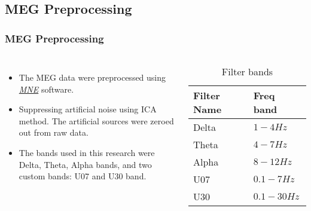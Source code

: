 \documentclass[aspectratio=169]{beamer}
\begin{document}
\subsection{MEG Preprocessing}
\begin{frame}
    \frametitle{MEG Preprocessing}

    \begin{columns}
        \begin{itemize}
            \item The MEG data were preprocessed using \hyperlink{https://mne.tools/stable/index.html}{\emph{MNE}} software.
            \item Suppressing artificial noise using ICA method.
                  The artificial sources were zeroed out from raw data.
            \item The bands used in this research were Delta, Theta, Alpha bands, and two custom bands: U07 and U30 band.
        \end{itemize}


        \begin{table}[t]
            \caption{Filter bands}
            \begin{tabular}{|l|l|}
                \hline
                \textbf{Filter Name} & \textbf{Freq band} \\
                \hline
                \hline
                Delta                & $1 - 4 Hz$         \\
                Theta                & $4 - 7 Hz$         \\
                Alpha                & $8 - 12 Hz$        \\
                \hline
                \hline
                U07                  & $0.1 - 7 Hz$       \\
                U30                  & $0.1 - 30 Hz$      \\
                \hline
            \end{tabular}
        \end{table}

    \end{columns}
\end{frame}
\end{document}
